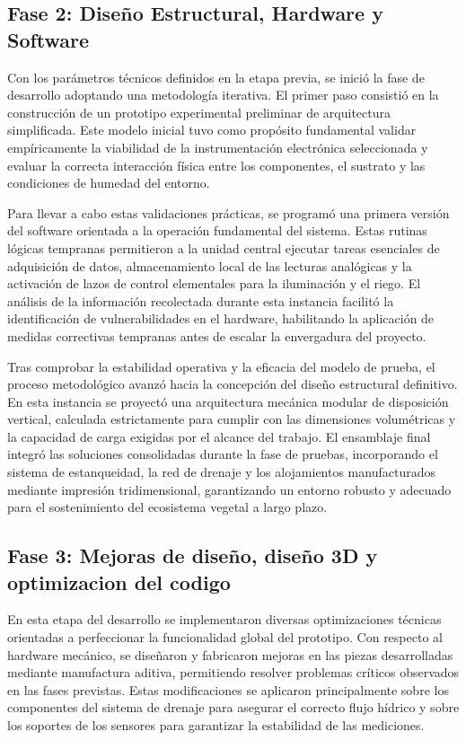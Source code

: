 \subsection{Fase 2: Diseño Estructural, Hardware y Software}
Con los parámetros técnicos definidos en la etapa previa, se inició la fase de desarrollo adoptando una metodología iterativa. El primer paso consistió en la construcción de un prototipo experimental preliminar de arquitectura simplificada. Este modelo inicial tuvo como propósito fundamental validar empíricamente la viabilidad de la instrumentación electrónica seleccionada y evaluar la correcta interacción física entre los componentes, el sustrato y las condiciones de humedad del entorno.

Para llevar a cabo estas validaciones prácticas, se programó una primera versión del software orientada a la operación fundamental del sistema. Estas rutinas lógicas tempranas permitieron a la unidad central ejecutar tareas esenciales de adquisición de datos, almacenamiento local de las lecturas analógicas y la activación de lazos de control elementales para la iluminación y el riego. El análisis de la información recolectada durante esta instancia facilitó la identificación de vulnerabilidades en el hardware, habilitando la aplicación de medidas correctivas tempranas antes de escalar la envergadura del proyecto.

Tras comprobar la estabilidad operativa y la eficacia del modelo de prueba, el proceso metodológico avanzó hacia la concepción del diseño estructural definitivo. En esta instancia se proyectó una arquitectura mecánica modular de disposición vertical, calculada estrictamente para cumplir con las dimensiones volumétricas y la capacidad de carga exigidas por el alcance del trabajo. El ensamblaje final integró las soluciones consolidadas durante la fase de pruebas, incorporando el sistema de estanqueidad, la red de drenaje y los alojamientos manufacturados mediante impresión tridimensional, garantizando un entorno robusto y adecuado para el sostenimiento del ecosistema vegetal a largo plazo.

\subsection{Fase 3: Mejoras de diseño, diseño 3D y optimizacion del codigo}
En esta etapa del desarrollo se implementaron diversas optimizaciones técnicas orientadas a perfeccionar la funcionalidad global del prototipo. Con respecto al hardware mecánico, se diseñaron y fabricaron mejoras en las piezas desarrolladas mediante manufactura aditiva, permitiendo resolver problemas críticos observados en las fases previstas. Estas modificaciones se aplicaron principalmente sobre los componentes del sistema de drenaje para asegurar el correcto flujo hídrico y sobre los soportes de los sensores para garantizar la estabilidad de las mediciones.

